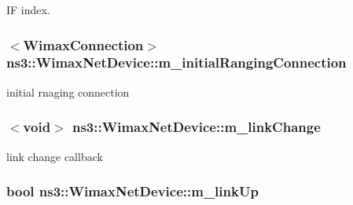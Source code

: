 IF index. 

\subsubsection[{\texorpdfstring{m\+\_\+initial\+Ranging\+Connection}{m_initialRangingConnection}}]{$<${\bf Wimax\+Connection}$>$ ns3\+::\+Wimax\+Net\+Device\+::m\+\_\+initial\+Ranging\+Connection\hspace{0.3cm}{\ttfamily [private]}}\hypertarget{classns3_1_1WimaxNetDevice_a2bcfecf3dcc39a5953561c544358e84d}{}\label{classns3_1_1WimaxNetDevice_a2bcfecf3dcc39a5953561c544358e84d}


initial rnaging connection 

\subsubsection[{\texorpdfstring{m\+\_\+link\+Change}{m_linkChange}}]{$<$void$>$ ns3\+::\+Wimax\+Net\+Device\+::m\+\_\+link\+Change\hspace{0.3cm}{\ttfamily [private]}}\hypertarget{classns3_1_1WimaxNetDevice_a9463f500f58fcda35b91076473dacfea}{}\label{classns3_1_1WimaxNetDevice_a9463f500f58fcda35b91076473dacfea}


link change callback 

\subsubsection[{\texorpdfstring{m\+\_\+link\+Up}{m_linkUp}}]{\setlength{\rightskip}{0pt plus 5cm}bool ns3\+::\+Wimax\+Net\+Device\+::m\+\_\+link\+Up\hspace{0.3cm}{\ttfamily [private]}}\hypertarget{classns3_1_1WimaxNetDevice_aecae6cf64706857700337c2807211426}{}\label{classns3_1_1WimaxNetDevice_aecae6cf64706857700337c2807211426}


